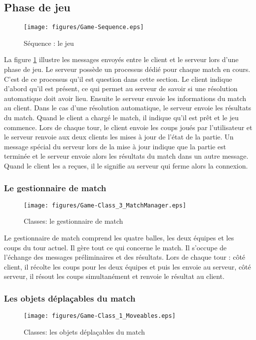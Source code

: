 \subsection{Phase de jeu}
\begin{figure}[h!]
  \centering
  \texttt{[image: figures/Game-Sequence.eps]}
  \caption{\label{fig:Sequence:Game} Séquence : le jeu}
\end{figure}
La figure \ref{fig:Sequence:Game} illustre les messages envoyés entre le \gls{client} et le \gls{serveur} 
lors d'une phase de jeu. 
Le serveur possède un processus dédié pour chaque match en cours. C'est de 
ce processus qu'il est question dans cette section.
Le client indique d'abord qu'il est présent, ce qui permet au serveur de 
savoir si une résolution automatique doit avoir lieu. 
Ensuite le serveur envoie les informations du match au client. Dans le cas 
d'une résolution automatique, le serveur envoie les résultats du match.
Quand le client a chargé le match, il indique qu'il est prêt et le jeu commence.
Lors de chaque tour, le client envoie les coups joués par l'utilisateur et le 
serveur renvoie aux deux clients les mises à jour de l'état de la partie.
Un message spécial du serveur lors de la mise à jour indique que la partie
est terminée et le serveur envoie alors les résultats du match dans un autre 
message. Quand le client les a reçues, il le signifie au serveur qui ferme 
alors la connexion.

\subsubsection{Le gestionnaire de match}
\begin{figure}[h!]
  \centering
  \texttt{[image: figures/Game-Class\_3\_MatchManager.eps]}
  \caption{\label{fig:Class:MatchManager} Classes: le gestionnaire de match}
\end{figure}

Le gestionnaire de match comprend les quatre balles, les deux équipes et les coups du 
tour actuel. Il gère tout ce qui concerne le match. Il s'occupe de l'échange 
des messages préliminaires et des résultats. Lors de chaque tour : côté 
client, il récolte les coups pour les deux équipes et puis les envoie au 
\gls{serveur}, côté serveur, il résout les coups simultanément et renvoie le résultat 
au \gls{client}.

\subsubsection{Les objets déplaçables du match}
\begin{figure}[h!]
  \centering
  \texttt{[image: figures/Game-Class\_1\_Moveables.eps]}
  \caption{\label{fig:Class:GameMoveables} Classes: les objets déplaçables du match}
\end{figure}

